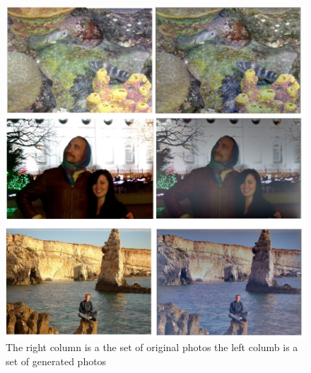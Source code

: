 \documentclass[10pt,twopage]{acmsiggraph}
\begin{document}
\begin{figure}[b]
\includegraphics[width=\linewidth]{fig/compilation.jpg}
\caption{The right column is a the set of original photos the left columb is a set of generated photos}
\label{mask}
\end{figure}



{\small}

%
%


\cleardoublepage
\end{document}
